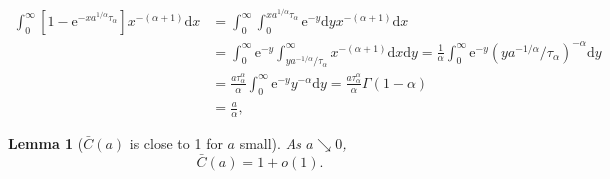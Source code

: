 \documentclass[10pt,a4paper]{amsart}
\newtheorem{lemma}{Lemma}
\newcommand{\e}{\mathrm{e}}
\newcommand{\nn}{\nonumber}
\begin{document}
\begin{align}
    \label{single-integral}
	\int_{0}^{\infty} [1-\e^{-xa^{1/\alpha} {\tau_\alpha}}]x^{-(\alpha+1)}
	{\mathrm d}x
	&=\int_{0}^{\infty} \int_0^{xa^{1/\alpha} {\tau_\alpha}} \e^{-y} {\mathrm d}y x^{-(\alpha+1)}
	{\mathrm d}x \\
	&=\int_{0}^{\infty} \e^{-y} \int_{ya^{-1/\alpha}/{\tau_\alpha}}^{\infty} x^{-(\alpha+1)}{\mathrm d}x
	{\mathrm d}y
	=\frac{1}{\alpha} \int_{0}^{\infty} \e^{-y} (ya^{-1/\alpha}/{\tau_\alpha})^{-\alpha}{\mathrm d}y\nn\\
    &=\frac{a\tau_\alpha^{\alpha}}{\alpha} \int_{0}^{\infty} \e^{-y} y^{-\alpha}{\mathrm d}y
	=\frac{a\tau_\alpha^{\alpha}}{\alpha}\Gamma(1-\alpha) \nn\\
    & =\frac{a}{\alpha},\nn
\end{align}

\begin{lemma}[$\bar{C}(a)$ is close to 1 for $a$ small]
\label{lem-annealed-small-a}
As $a\searrow 0$,
	\begin{equation}
	    \bar{C}(a)=1+o(1).
	\end{equation}
\end{lemma} 
\end{document}
